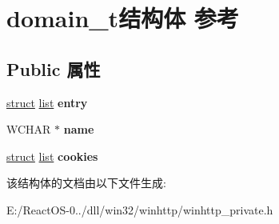 \hypertarget{structdomain__t}{}\section{domain\+\_\+t结构体 参考}
\label{structdomain__t}
\subsection*{Public 属性}
\begin{DoxyCompactItemize}
\item 
\mbox{\label{structdomain__t_a46e82d292070821258d7670fcde59a8a}} 
\hyperlink{interfacestruct}{struct} \hyperlink{classlist}{list} {\bfseries entry}
\item 
\mbox{\label{structdomain__t_a91980e27155ebf7cf937e14f155b5935}} 
W\+C\+H\+AR $\ast$ {\bfseries name}
\item 
\mbox{\label{structdomain__t_ab479e042187eccd725991b63b3679ade}} 
\hyperlink{interfacestruct}{struct} \hyperlink{classlist}{list} {\bfseries cookies}
\end{DoxyCompactItemize}


该结构体的文档由以下文件生成\+:\begin{DoxyCompactItemize}
\item 
E\+:/\+React\+O\+S-\/0../dll/win32/winhttp/winhttp\+\_\+private.\+h\end{DoxyCompactItemize}

